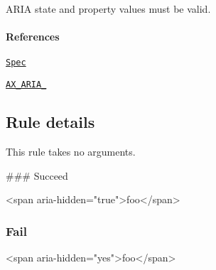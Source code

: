 A\+R\+IA state and property values must be valid.

\paragraph*{References}


\begin{DoxyEnumerate}
\item \href{https://www.w3.org/TR/wai-aria/states_and_properties}{\tt Spec}
\item \href{https://github.com/GoogleChrome/accessibility-developer-tools/wiki/Audit-Rules#ax_aria_04}{\tt A\+X\+\_\+\+A\+R\+I\+A\+\_}
\end{DoxyEnumerate}

\subsection*{Rule details}

This rule takes no arguments.

\#\#\# Succeed 
\begin{DoxyCode}
<span aria-hidden="true">foo</span>
\end{DoxyCode}


\subsubsection*{Fail}


\begin{DoxyCode}
<span aria-hidden="yes">foo</span>
\end{DoxyCode}
 